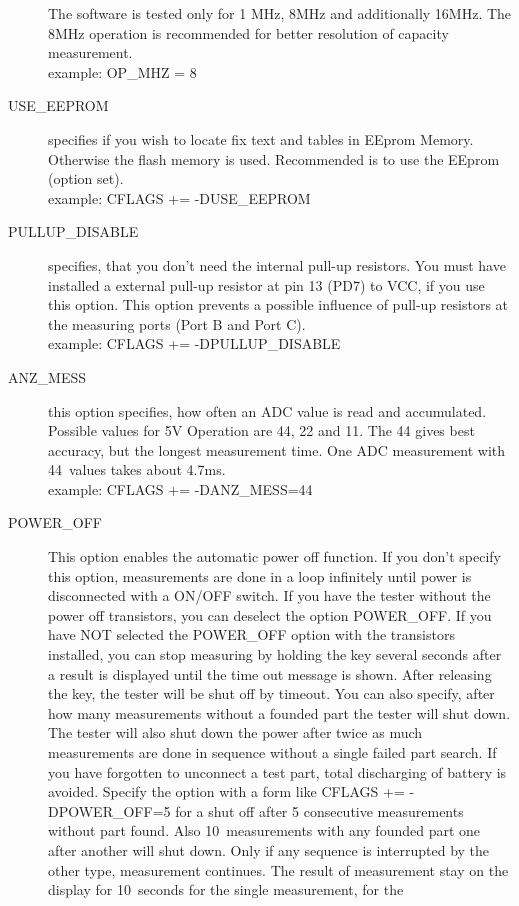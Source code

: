 \begin{description}
The software is tested only for 1 MHz, 8MHz and additionally 16MHz. The 8MHz operation is recommended for better resolution of capacity measurement.\\
example: OP\_MHZ = 8
  \item[USE\_EEPROM] specifies if you wish to locate fix text and tables in EEprom Memory. Otherwise the flash memory is used.
Recommended is to use the EEprom (option set).\\
example: CFLAGS += -DUSE\_EEPROM
  \item[PULLUP\_DISABLE] specifies, that you don't need the internal pull-up resistors.
 You must have installed a external pull-up resistor at pin 13 (PD7) to VCC, if you use this option.
This option prevents a possible influence of pull-up resistors at the measuring ports (Port B and Port C).\\
example: CFLAGS += -DPULLUP\_DISABLE
  \item[ANZ\_MESS] this option specifies, how often an ADC value is read and accumulated.
Possible values for 5V Operation are 44, 22 and 11. The 44 gives best accuracy, but the longest measurement time.
One ADC measurement with 44~values takes about 4.7ms.\\
example: CFLAGS += -DANZ\_MESS=44
  \item[POWER\_OFF] This option enables the automatic power off function. If you don't specify this option,
 measurements are done in a loop infinitely  until power is disconnected with a ON/OFF switch.
If you have the tester without the power off transistors, you can deselect the option POWER\_OFF.
If you have NOT selected the POWER\_OFF option with the transistors installed,
you can stop measuring by holding the key several seconds after a result is displayed until the time out message is shown.
After releasing the key, the tester will be shut off by timeout.
You can also specify, after how many measurements without a founded part the tester will shut down.
The tester will also shut down the power after twice as much measurements are done in sequence without a
single failed part search. If you have forgotten to unconnect a test part, total discharging of battery is avoided. 
Specify the option with a form like CFLAGS += -DPOWER\_OFF=5 for a shut off after 5 consecutive measurements
without part found. Also 10~measurements with any founded part one after another will shut down.
Only if any sequence is interrupted by the other type, measurement continues.
The result of measurement stay on the display for 10~seconds for the single measurement, for the

\end{description}
